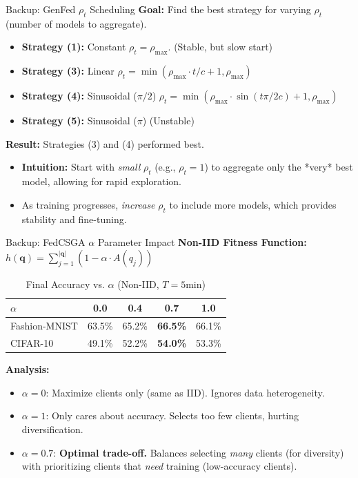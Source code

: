 \documentclass{beamer}
\begin{document}
\begin{frame}{Backup: GenFed $\rho_t$ Scheduling}
\textbf{Goal:} Find the best strategy for varying $\rho_t$ (number of models to aggregate).

\begin{itemize}
    \item \textbf{Strategy (1):} Constant $\rho_t = \rho_{\max}$. (Stable, but slow start)
    \item \textbf{Strategy (3):} Linear $\rho_t = \min(\rho_{\max} \cdot t/c + 1, \rho_{\max})$
    \item \textbf{Strategy (4):} Sinusoidal ($\pi/2$) $\rho_t = \min(\rho_{\max} \cdot \sin(t\pi/2c) + 1, \rho_{\max})$
    \item \textbf{Strategy (5):} Sinusoidal ($\pi$) (Unstable)
\end{itemize}

\textbf{Result:} Strategies (3) and (4) performed best.
\begin{itemize}
    \item \textbf{Intuition:} Start with \textit{small} $\rho_t$ (e.g., $\rho_t=1$) to aggregate only the *very* best model, allowing for rapid exploration.
    \item As training progresses, \textit{increase} $\rho_t$ to include more models, which provides stability and fine-tuning.
\end{itemize}
\end{frame}

\begin{frame}{Backup: FedCSGA $\alpha$ Parameter Impact}
\textbf{Non-IID Fitness Function:} $h(\mathbf{q}) = \sum_{j=1}^{|\mathbf{q}|} (1 - \alpha \cdot A(q_j))$

\begin{table}
\centering
\footnotesize
\caption{Final Accuracy vs. $\alpha$ (Non-IID, $T=5$min)}
\begin{tabular}{lcccc}
\toprule
$\alpha$ & 0.0 & 0.4 & \textbf{0.7} & 1.0 \\
\midrule
Fashion-MNIST & 63.5\% & 65.2\% & \textbf{66.5\%} & 66.1\% \\
CIFAR-10 & 49.1\% & 52.2\% & \textbf{54.0\%} & 53.3\% \\
\bottomrule
\end{tabular}
\end{table}
\vspace{0.3cm}
\textbf{Analysis:}
\begin{itemize}
    \item $\alpha=0$: Maximize clients only (same as IID). Ignores data heterogeneity.
    \item $\alpha=1$: Only cares about accuracy. Selects too few clients, hurting diversification.
    \item $\alpha=0.7$: \textbf{Optimal trade-off.} Balances selecting \textit{many} clients (for diversity) with prioritizing clients that \textit{need} training (low-accuracy clients).
\end{itemize}
\end{frame}
\end{document}
